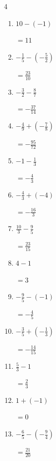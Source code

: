 \begin{multicols}{4}
\begin{enumerate}
        $\displaystyle =-\frac{10}{3}$

  \item $\displaystyle 10 - \left(-1\right)$

        $\displaystyle =11$

  \item $\displaystyle -\frac{1}{5} - \left(-\frac{5}{2}\right)$

        $\displaystyle =\frac{23}{10}$

  \item $\displaystyle -\frac{3}{2} - \frac{8}{7}$

        $\displaystyle =-\frac{37}{14}$

\columnbreak %

  \item $\displaystyle -\frac{4}{9} + \left(-\frac{7}{8}\right)$

        $\displaystyle =-\frac{95}{72}$

  \item $\displaystyle -1 - \frac{1}{3}$

        $\displaystyle =-\frac{4}{3}$

  \item $\displaystyle -\frac{4}{3} + \left(-4\right)$

        $\displaystyle =-\frac{16}{3}$

  \item $\displaystyle \frac{10}{3} - \frac{9}{5}$

        $\displaystyle =\frac{23}{15}$

  \item $\displaystyle 4 - 1$

        $\displaystyle =3$

  \item $\displaystyle -\frac{9}{5} - \left(-1\right)$

        $\displaystyle =-\frac{4}{5}$

  \item $\displaystyle -\frac{3}{5} + \left(-\frac{1}{3}\right)$

        $\displaystyle =-\frac{14}{15}$

  \item $\displaystyle \frac{5}{3} - 1$

        $\displaystyle =\frac{2}{3}$

  \item $\displaystyle 1 + \left(-1\right)$

        $\displaystyle =0$

  \item $\displaystyle -\frac{6}{5} - \left(-\frac{9}{4}\right)$

        $\displaystyle =\frac{21}{20}$

\end{enumerate}
\end{multicols}

